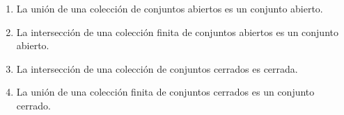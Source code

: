 \documentclass[
  letterpaper,
  DIV=11,
  numbers=noendperiod]{scrreport}
\providecommand{\tightlist}{%
  \setlength{\itemsep}{0pt}\setlength{\parskip}{0pt}}\usepackage{longtable,booktabs,array}
\theoremstyle{definition}
\theoremstyle{remark}
\begin{document}
\begin{enumerate}
  \begin{enumerate}
  \def\labelenumii{\alph{enumii}.}
  \tightlist
  \item
    La unión de una colección de conjuntos abiertos es un conjunto
    abierto.
  \item
    La intersección de una colección finita de conjuntos abiertos es un
    conjunto abierto.
  \item
    La intersección de una colección de conjuntos cerrados es cerrada.
  \item
    La unión de una colección finita de conjuntos cerrados es un
    conjunto cerrado.
  \end{enumerate}
\end{enumerate}
\end{document}

